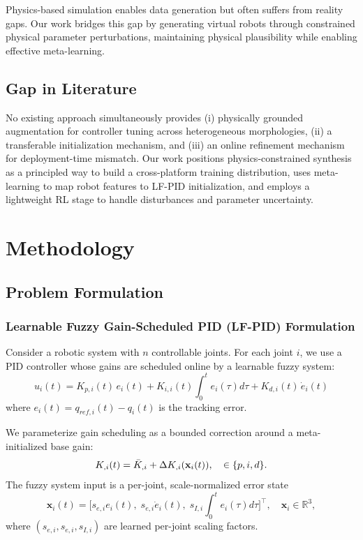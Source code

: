 \documentclass[DTMColor]{ROB-New}
\begin{document}
Physics-based simulation \cite{todorov2012mujoco} enables data generation but often suffers from reality gaps. Our work bridges this gap by generating virtual robots through constrained physical parameter perturbations, maintaining physical plausibility while enabling effective meta-learning.

\subsection{Gap in Literature}

No existing approach simultaneously provides (i) physically grounded augmentation for controller tuning across heterogeneous morphologies, (ii) a transferable initialization mechanism, and (iii) an online refinement mechanism for deployment-time mismatch. Our work positions physics-constrained synthesis as a principled way to build a cross-platform training distribution, uses meta-learning to map robot features to LF-PID initialization, and employs a lightweight RL stage to handle disturbances and parameter uncertainty.

\section{Methodology}
\label{sec:methodology}

\subsection{Problem Formulation}

\subsubsection{Learnable Fuzzy Gain-Scheduled PID (LF-PID) Formulation}

Consider a robotic system with $n$ controllable joints. For each joint $i$, we use a PID controller whose gains are scheduled online by a learnable fuzzy system:
\begin{equation}
    u_i(t) = K_{p,i}(t)\, e_i(t) + K_{i,i}(t) \int_0^t e_i(\tau) d\tau + K_{d,i}(t)\, \dot{e}_i(t)
\end{equation}
where $e_i(t) = q_{ref,i}(t) - q_i(t)$ is the tracking error.

We parameterize gain scheduling as a bounded correction around a meta-initialized base gain:
\begin{equation}
    K_{\*,i}(t) = \bar{K}_{\*,i} + \Delta K_{\*,i}(\mathbf{x}_i(t)), \quad \* \in \{p,i,d\}.
\end{equation}
The fuzzy system input is a per-joint, scale-normalized error state
\begin{equation}
    \mathbf{x}_i(t) = \big[s_{e,i} e_i(t),\; s_{\dot e,i} \dot e_i(t),\; s_{I,i} \!\int_0^t e_i(\tau)d\tau\big]^\top,\quad \mathbf{x}_i \in \mathbb{R}^3,
\end{equation}
where $(s_{e,i}, s_{\dot e,i}, s_{I,i})$ are learned per-joint scaling factors.
\end{document}
